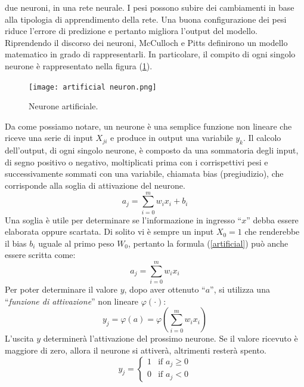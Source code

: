 due neuroni, in una rete neurale. I pesi possono subire dei cambiamenti in 
base alla tipologia di apprendimento della rete. Una buona configurazione 
dei pesi riduce l'errore di predizione e pertanto migliora l'output del modello. 
Riprendendo il discorso dei neuroni, McCulloch e Pitts  \cite{Chakraverty2019} definirono un 
modello matematico in grado di rappresentarli. In particolare, il compito di 
ogni singolo neurone è rappresentato nella figura (\ref{neural neuron}).
\begin{figure}
    \centering
    \texttt{[image: artificial neuron.png]}
    \centering
    \caption{Neurone artificiale.}
    \label{neural neuron}
\end{figure}
Da come possiamo 
notare, un neurone è una semplice funzione non lineare che riceve una serie 
di input $X_{ji}$ e produce in output una variabile $y_k$. Il calcolo dell'output, 
di ogni singolo neurone, è composto da una sommatoria degli input, di 
segno positivo o negativo, moltiplicati prima con i corrispettivi pesi e 
successivamente sommati con una variabile, chiamata bias (pregiudizio), 
che corrisponde alla soglia di attivazione del neurone.
\begin{equation}\label{artificial}
    a_j = \sum_{i=0}^m w_{i}x_i + b_i 
\end{equation}
Una soglia è utile per determinare se l'informazione in ingresso “$x$” debba 
essere elaborata oppure scartata. Di solito vi è sempre un input $X_0=1$ 
che renderebbe il bias $ b_i $ uguale al primo peso $W_0$, pertanto la formula (\ref{artificial}) 
può anche essere scritta come:
\begin{equation}\label{artificial without bias}
    a_j = \sum_{i=0}^m w_{i}x_i
\end{equation}
Per poter determinare il valore $y$, dopo aver ottenuto “$a$”, si utilizza una 
“\emph{funzione di attivazione}” non lineare $\varphi(\cdot)$:
\begin{equation}\label{activation function 1}
    y_j = \varphi(a) = \varphi\left(\sum_{i=0}^m w_ix_i\right)
\end{equation}
L'uscita $y$ determinerà l'attivazione del prossimo neurone. Se il valore 
ricevuto è maggiore di zero, allora il neurone si attiverà, altrimenti resterà 
spento.
\begin{equation}\label{activation function 2}
    y_j = \left\{
        \begin{array}{rl}
        1 & \mbox{if } a_j \geq 0 \\
        0 & \mbox{if } a_j < 0
        \end{array}
        \right.
\end{equation}
